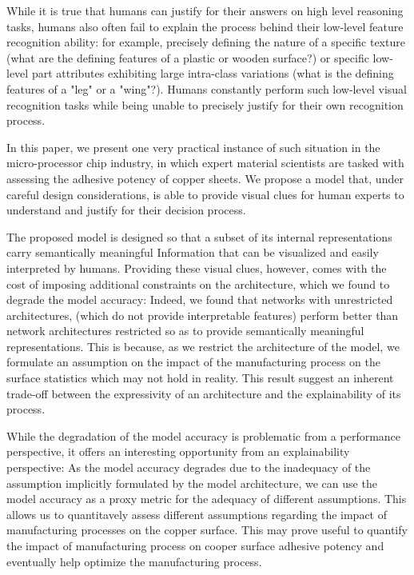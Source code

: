 \documentclass[10pt,twocolumn,letterpaper]{article}
\begin{document}
While it is true that humans can justify for their answers on high level reasoning tasks, 
humans also often fail to explain the process behind their low-level feature recognition ability:
for example, precisely defining the nature of a specific texture (what are the defining features of a plastic or wooden surface?) or specific low-level part attributes exhibiting large intra-class variations (what is the defining features of a "leg" or a "wing"?).
Humans constantly perform such low-level visual recognition tasks while being unable to precisely justify for their own recognition process.

In this paper, we present one very practical instance of such situation in the micro-processor chip industry, 
in which expert material scientists are tasked with assessing the adhesive potency of copper sheets.
We propose a model that, under careful design considerations, is able to provide visual clues 
for human experts to understand and justify for their decision process.

The proposed model is designed so that a subset of its internal representations carry semantically meaningful 
Information that can be visualized and easily interpreted by humans.
Providing these visual clues, however, comes with the cost of imposing additional constraints on the architecture,
which we found to degrade the model accuracy:
Indeed, we found that networks with unrestricted architectures, 
(which do not provide interpretable features)
perform better than network architectures restricted so as to provide 
semantically meaningful representations.
This is because, as we restrict the architecture of the model, 
we formulate an assumption on the impact of the manufacturing process 
on the surface statistics which may not hold in reality.
This result suggest an inherent trade-off between the 
expressivity of an architecture and the explainability of its process.

While the degradation of the model accuracy is problematic from a performance perspective,
it offers an interesting opportunity from an explainability perspective:
As the model accuracy degrades due to the inadequacy of the assumption implicitly formulated by the model architecture,
we can use the model accuracy as a proxy metric for the adequacy of different assumptions.
This allows us to quantitavely assess different assumptions regarding the impact 
of manufacturing processes on the copper surface. 
This may prove useful to quantify the impact of manufacturing process on cooper surface adhesive potency
and eventually help optimize the manufacturing process.
\end{document}
